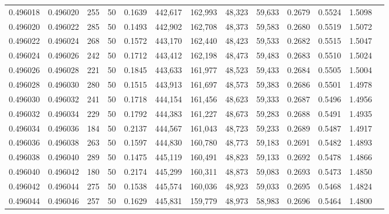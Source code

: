 \begin{tabular}{rrrrrrrrrrrrr}
0.496018 & 0.496020 &   255 &  50 &                                     0.1639 & 442,617 & 162,993 &  48,323 &  59,633 & 0.2679 & 0.5524 & 1.5098 \\
0.496020 & 0.496022 &   285 &  50 &                                     0.1493 & 442,902 & 162,708 &  48,373 &  59,583 & 0.2680 & 0.5519 & 1.5072 \\
0.496022 & 0.496024 &   268 &  50 &                                     0.1572 & 443,170 & 162,440 &  48,423 &  59,533 & 0.2682 & 0.5515 & 1.5047 \\
0.496024 & 0.496026 &   242 &  50 &                                     0.1712 & 443,412 & 162,198 &  48,473 &  59,483 & 0.2683 & 0.5510 & 1.5024 \\
0.496026 & 0.496028 &   221 &  50 &                                     0.1845 & 443,633 & 161,977 &  48,523 &  59,433 & 0.2684 & 0.5505 & 1.5004 \\
0.496028 & 0.496030 &   280 &  50 &                                     0.1515 & 443,913 & 161,697 &  48,573 &  59,383 & 0.2686 & 0.5501 & 1.4978 \\
0.496030 & 0.496032 &   241 &  50 &                                     0.1718 & 444,154 & 161,456 &  48,623 &  59,333 & 0.2687 & 0.5496 & 1.4956 \\
0.496032 & 0.496034 &   229 &  50 &                                     0.1792 & 444,383 & 161,227 &  48,673 &  59,283 & 0.2688 & 0.5491 & 1.4935 \\
0.496034 & 0.496036 &   184 &  50 &                                     0.2137 & 444,567 & 161,043 &  48,723 &  59,233 & 0.2689 & 0.5487 & 1.4917 \\
0.496036 & 0.496038 &   263 &  50 &                                     0.1597 & 444,830 & 160,780 &  48,773 &  59,183 & 0.2691 & 0.5482 & 1.4893 \\
0.496038 & 0.496040 &   289 &  50 &                                     0.1475 & 445,119 & 160,491 &  48,823 &  59,133 & 0.2692 & 0.5478 & 1.4866 \\
0.496040 & 0.496042 &   180 &  50 &                                     0.2174 & 445,299 & 160,311 &  48,873 &  59,083 & 0.2693 & 0.5473 & 1.4850 \\
0.496042 & 0.496044 &   275 &  50 &                                     0.1538 & 445,574 & 160,036 &  48,923 &  59,033 & 0.2695 & 0.5468 & 1.4824 \\
0.496044 & 0.496046 &   257 &  50 &                                     0.1629 & 445,831 & 159,779 &  48,973 &  58,983 & 0.2696 & 0.5464 & 1.4800 \\

\end{tabular}
